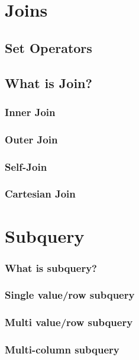 \documentclass[14pt,fleqn]{extbook} %
\begin{document}
\chapter{Joins}
\section{Set Operators}

\section{What is Join?}

\subsection{Inner Join}

\subsection{Outer Join}

\subsection{Self-Join}

\subsection{Cartesian Join}


\chapter{Subquery}
\subsection{What is subquery?}

\subsection{Single value/row subquery}

\subsection{Multi value/row subquery}

\subsection{Multi-column subquery}

\end{document}
